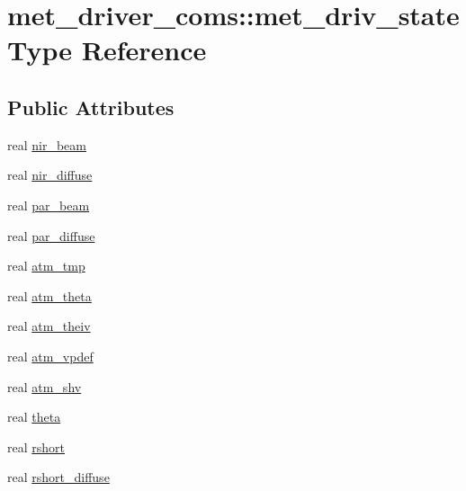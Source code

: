 \hypertarget{structmet__driver__coms_1_1met__driv__state}{}\section{met\+\_\+driver\+\_\+coms\+:\+:met\+\_\+driv\+\_\+state Type Reference}
\label{structmet__driver__coms_1_1met__driv__state}
\subsection*{Public Attributes}
\begin{DoxyCompactItemize}
\item 
real \hyperlink{structmet__driver__coms_1_1met__driv__state_a94e16c4badc7e431bdb2fd9c7b67a542}{nir\+\_\+beam}
\item 
real \hyperlink{structmet__driver__coms_1_1met__driv__state_aa6d71598746399cda26f69f9b132fe65}{nir\+\_\+diffuse}
\item 
real \hyperlink{structmet__driver__coms_1_1met__driv__state_a2b50238d52991de8f4f06e9fb892d836}{par\+\_\+beam}
\item 
real \hyperlink{structmet__driver__coms_1_1met__driv__state_aee767e923de4d1f4ad21c22a96c25a87}{par\+\_\+diffuse}
\item 
real \hyperlink{structmet__driver__coms_1_1met__driv__state_a6a1fcf8b9ea2b8d6b2ea94b49a10b6d6}{atm\+\_\+tmp}
\item 
real \hyperlink{structmet__driver__coms_1_1met__driv__state_a9b1442c39d5321c185589c7c544c888d}{atm\+\_\+theta}
\item 
real \hyperlink{structmet__driver__coms_1_1met__driv__state_a7c14953269b6f284ac234253ef333665}{atm\+\_\+theiv}
\item 
real \hyperlink{structmet__driver__coms_1_1met__driv__state_afca30d8e71347214cdd6fc66d58ac200}{atm\+\_\+vpdef}
\item 
real \hyperlink{structmet__driver__coms_1_1met__driv__state_a1236602d5c5582518d16c8bae639d894}{atm\+\_\+shv}
\item 
real \hyperlink{structmet__driver__coms_1_1met__driv__state_a0c7da64fc0aa6f6d0a87a7722a4bfcf6}{theta}
\item 
real \hyperlink{structmet__driver__coms_1_1met__driv__state_a330ba8bfdce03630d75a2362f51a96ff}{rshort}
\item 
real \hyperlink{structmet__driver__coms_1_1met__driv__state_a44cec1066fb4d1309dd79dd8922109bc}{rshort\+\_\+diffuse}

\end{DoxyCompactItemize}
